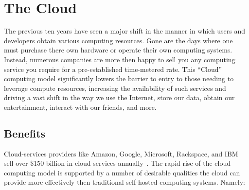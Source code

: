 \section{The Cloud}
\label{chap:background:cloud}

The previous ten years have seen a major shift in the manner in which
users and developers obtain various computing resources. Gone are the
days where one must purchase there own hardware or operate their own
computing systems. Instead, numerous companies are more then happy to
sell you any computing service you require for a pre-established
time-metered rate. This ``Cloud'' computing model significantly lowers
the barrier to entry to those needing to leverage compute resources,
increasing the availability of such services and driving a vast shift
in the way we use the Internet, store our data, obtain our
entertainment, interact with our friends, and more.

\subsection{Benefits}

Cloud-services providers like Amazon, Google, Microsoft, Rackspace,
and IBM sell over \$150 billion in cloud services
annually~\cite{flood2013}. The rapid rise of the cloud computing model
is supported by a number of desirable qualities the cloud can provide
more effectively then traditional self-hosted computing
systems. Namely:


